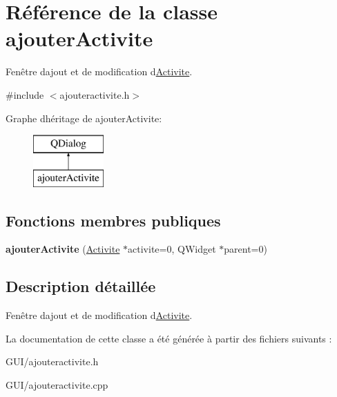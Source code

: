 \hypertarget{classajouter_activite}{}\section{Référence de la classe ajouter\+Activite}
\label{classajouter_activite}


Fenêtre d\textquotesingle{}ajout et de modification d\textquotesingle{}\hyperlink{class_activite}{Activite}.  




{\ttfamily \#include $<$ajouteractivite.\+h$>$}

Graphe d\textquotesingle{}héritage de ajouter\+Activite\+:\begin{figure}[H]
\begin{center}
\leavevmode
\includegraphics[height=2.000000cm]{classajouter_activite}
\end{center}
\end{figure}
\subsection*{Fonctions membres publiques}
\begin{DoxyCompactItemize}
\item 
\hypertarget{classajouter_activite_af65ef144a5efeed204f428d77dfb2418}{}{\bfseries ajouter\+Activite} (\hyperlink{class_activite}{Activite} $\ast$activite=0, Q\+Widget $\ast$parent=0)\label{classajouter_activite_af65ef144a5efeed204f428d77dfb2418}

\end{DoxyCompactItemize}


\subsection{Description détaillée}
Fenêtre d\textquotesingle{}ajout et de modification d\textquotesingle{}\hyperlink{class_activite}{Activite}. 

La documentation de cette classe a été générée à partir des fichiers suivants \+:\begin{DoxyCompactItemize}
\item 
G\+U\+I/ajouteractivite.\+h\item 
G\+U\+I/ajouteractivite.\+cpp\end{DoxyCompactItemize}
